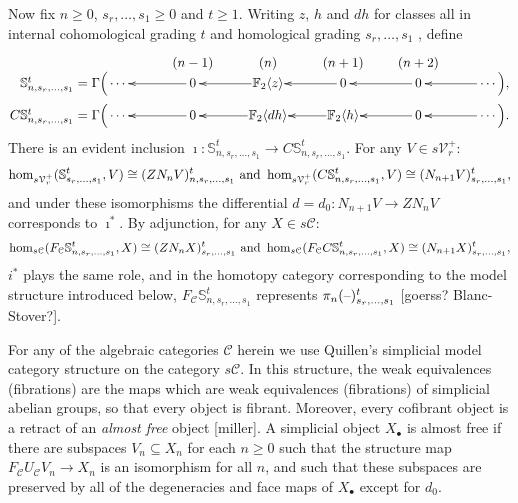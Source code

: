 \documentclass[11pt]{amsart}
\theoremstyle{plain}
\theoremstyle{definition}
\newcommand{\DASH}{\textup{--}}
\renewcommand{\to}{\longrightarrow}
\newcommand{\calC}{\mathcal{C}}
\newcommand{\calV}{\mathcal{V}}
\theoremstyle{plain}
\newcommand{\vect}[2]{\calV^{#1}_{#2}}
\newcommand{\F}{\mathbb{F}}
\begin{document}
\begin{Conventions and notation}
Now fix $n\geq0$, $s_r,\ldots,s_1\geq0$ and $t\geq1$. Writing $z$, $h$ and $dh$ for classes all in internal cohomological grading $t$ and homological grading $s_r,\ldots,s_1$ , define
\begin{gather*}
\phantom{C\mathbb{S}_{n,s_r,\ldots,s_1}^t=\Gamma\Bigl(}\xymatrix@R=1.5mm@1@!C{
&{\smash{(n-1)}}&{\smash{(n)}}&{\smash{(n+1)}}&{\smash{(n+2)}}\\
{\makebox[0cm][r]{$\,\mathbb{S}_{n,s_r,\ldots,s_1}^t=\Gamma\Bigl($}\cdots\,} &%
{\,0\,}\ar[l]
&%
\F_2\langle z\rangle\ar[l]
&%
{\,0\,}\ar[l]
&{\,0\,}\ar[l]
&{\,\cdots\Bigr),} \ar[l]
\\
{\makebox[0cm][r]{$\,C\mathbb{S}_{n,s_r,\ldots,s_1}^t=\Gamma\Bigl($}\cdots\,} &%
{\,0\,}\ar[l]
&%
\F_2\langle dh\rangle\ar[l]
&%
\F_2\langle h\rangle\ar[l]
&{\,0\,}\ar[l]
&{\,\cdots\Bigr).} \ar[l]
}
\end{gather*}
There is an evident inclusion $\imath:\mathbb{S}_{n,s_r,\ldots,s_1}^t\to C\mathbb{S}_{n,s_r,\ldots,s_1}^t$. For any $V\in s\vect{+}{r}$:
\[\hom_{s\vect{+}{r}}(\mathbb{S}^t_{s_r,\ldots,s_1},V)\cong (ZN_nV)_{n,s_r,\ldots,s_1}^t\textup{ and }\hom_{s\vect{+}{r}}(C\mathbb{S}^t_{n,s_r,\ldots,s_1},V)\cong (N_{n+1}V)_{s_r,\ldots,s_1}^t,\]
and under these isomorphisms the differential $d=d_0:N_{n+1}V\to ZN_nV$ corresponds to $\imath^*$.
By adjunction, for any $X\in s\calC$:
\[\hom_{s\calC}(F_\calC\mathbb{S}^t_{n,s_r,\ldots,s_1},X)\cong (ZN_nX)_{s_r,\ldots,s_1}^t\textup{ and }\hom_{s\calC}(F_{\calC}C\mathbb{S}^t_{n,s_r,\ldots,s_1},X)\cong (N_{n+1}X)_{s_r,\ldots,s_1}^t,\]
$i^*$ plays the same role, and in the homotopy category corresponding to the model structure introduced below, $F_\calC\mathbb{S}^t_{n,s_r,\ldots,s_1}$ represents $\pi_n(\DASH)^t_{s_r,\ldots,s_1}$ [goerss? Blanc-Stover?].

For any of the algebraic categories $\calC$ herein we use Quillen's simplicial model category structure on the category $s\calC$. In this structure, the weak equivalences (fibrations) are the maps which are weak equivalences (fibrations) of simplicial abelian groups, so that every object is fibrant. Moreover, every cofibrant object is a retract of an \emph{almost free} object [miller]. A simplicial object $X_\bullet$ is almost free if there are subspaces $V_n\subseteq X_n$ for each $n\geq0$ such that the structure map $F_{\calC}U_\calC V_n\to X_n$ is an isomorphism for all $n$, and such that these subspaces are preserved by all of the degeneracies and face maps of $X_\bullet$ except for $d_0$.


\end{Conventions and notation}
\end{document}
